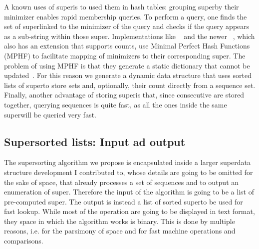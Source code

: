 A known uses of super\kmers is to used them in hash tables: grouping super\kmers by their minimizer enables rapid membership queries. To perform a query, one finds the set of super\kmer linked to the minimizer of the query \kmer and checks if the query \kmer appears as a sub-string within those super\kmer. Implementations like \blight~\cite{blight} and the newer \ssh~\cite{sshash}, which also has an extension that supports \kmer counts, use Minimal Perfect Hash Functions (MPHF) to facilitate mapping of minimizers to their corresponding super\kmers. The problem of using MPHF is that they generate a static dictionary that cannot be updated~\cite{smsketch}. For this reason we generate a dynamic data structure that uses sorted lists of super\kmers to store \kmer sets and, optionally, their count directly from a sequence set.
Finally, another advantage of storing super\kmers is that, since consecutive \kmers are stored together, querying sequences is quite fast, as all the ones inside the same super\kmer will be queried very fast.

\subsection{Super\kmer sorted lists: Input ad output}
The super\kmer sorting algorithm we propose is encapsulated inside a larger super\kmer data structure development I contributed to, whose details are going to be omitted for the sake of space, that already processes a set of sequences and to output an enumeration of super\kmers. Therefore the input of the algorithm is going to be a list of pre-computed super\kmers. The output is instead a list of sorted super\kmers to be used for fast lookup. While most of the operation are going to be displayed in text format, they space in which the algorithm works is binary. This is done by multiple reasons, i.e. for the parsimony of space and for fast machine operations and comparisons.

